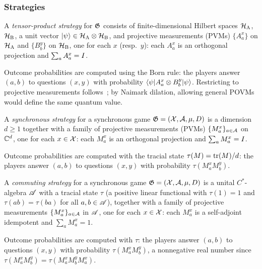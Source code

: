\subsubsection{Strategies}


\begin{definition}
\label{def:tensor-strategy}
\leanok
\qlib{}
A \emph{tensor-product strategy} for $\mathfrak{G}$ consists of finite-dimensional Hilbert
spaces $\mathcal{H}_{\textsc{A}}$, $\mathcal{H}_{\textsc{B}}$, a unit vector $|\psi\rangle \in \mathcal{H}_{\textsc{A}} \otimes
\mathcal{H}_{\textsc{B}}$, and projective measurements (PVMs) $\{A^x_a\}$ on $\mathcal{H}_{\textsc{A}}$ and
$\{B^y_b\}$ on $\mathcal{H}_{\textsc{B}}$, one for each $x$ (resp.\ $y$): each $A^x_a$ is an
orthogonal projection and $\sum_a A^x_a = I$.

Outcome probabilities are computed using the Born rule: the players answer $(a,b)$ to questions $(x,y)$
with probability $\langle\psi| A^x_a \otimes B^y_b |\psi\rangle$. Restricting to projective
measurements follows~\cite{JNVWY20}; by Naimark dilation, allowing general POVMs
would define the same quantum value.
\end{definition}


\begin{definition}
\label{def:sync-strategy}
\leanok
\qlib{}
A \emph{synchronous strategy} for a synchronous game $\mathfrak{G} = (\mathcal{X}, \mathcal{A}, \mu, D)$ is a
dimension $d \geq 1$ together with a family of projective measurements (PVMs)
$\{M^x_a\}_{a \in \mathcal{A}}$ on $\mathbb{C}^d$, one for each $x \in \mathcal{X}$: each $M^x_a$ is an
orthogonal projection and $\sum_a M^x_a = I$. 

Outcome probabilities are computed with the
tracial state $\tau(M) = \operatorname{tr}(M)/d$: the players answer $(a,b)$ to questions $(x,y)$
with probability $\tau(M^x_a M^y_b)$.
\end{definition}


\begin{definition}
\label{def:commuting-strategy}
\leanok
\qlib{}
A \emph{commuting strategy} for a synchronous game $\mathfrak{G} = (\mathcal{X}, \mathcal{A}, \mu, D)$ is a
unital $C^*$-algebra $\mathscr{A}$ with a tracial state $\tau$ (a positive linear functional
with $\tau(1) = 1$ and $\tau(ab) = \tau(ba)$ for all $a, b \in \mathscr{A}$), together with a
family of projective measurements $\{M^x_a\}_{a \in \mathcal{A}}$ in $\mathscr{A}$, one for each
$x \in \mathcal{X}$: each $M^x_a$ is a self-adjoint idempotent and $\sum_a M^x_a = 1$.

Outcome probabilities are computed with $\tau$: the players answer $(a,b)$ to questions
$(x,y)$ with probability $\tau(M^x_a M^y_b)$, a nonnegative real number since
$\tau(M^x_a M^y_b) = \tau(M^x_a M^y_b M^x_a)$.
\end{definition}


